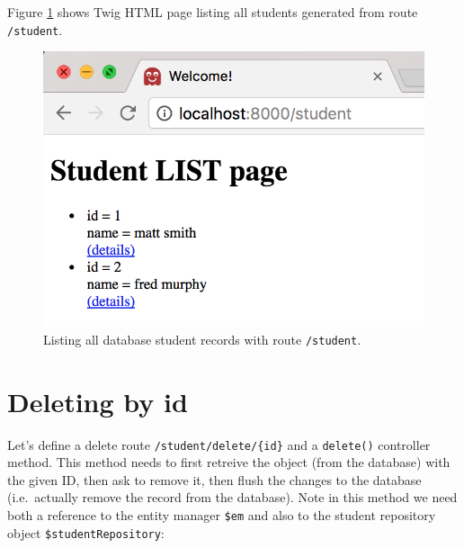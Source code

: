 \documentclass[a4paperpaper,openright]{book}
\begin{document}
Figure \ref{student_list2} shows Twig HTML page listing all students
generated from route \texttt{/student}.

\begin{figure}
\centering
\includegraphics{./tex2pdf.-8aed53dcd332a606/d6c231f28f39e6b1be9d1ad08365c598d6620f5d.png}
\caption{Listing all database student records with route
\texttt{/student}. \label{student_list2}}
\end{figure}

\hypertarget{deleting-by-id}{%
\section{Deleting by id}\label{deleting-by-id}}

Let's define a delete route \texttt{/student/delete/\{id\}} and a
\texttt{delete()} controller method. This method needs to first retreive
the object (from the database) with the given ID, then ask to remove it,
then flush the changes to the database (i.e.~actually remove the record
from the database). Note in this method we need both a reference to the
entity manager \texttt{\$em} and also to the student repository object
\texttt{\$studentRepository}:
\end{document}
